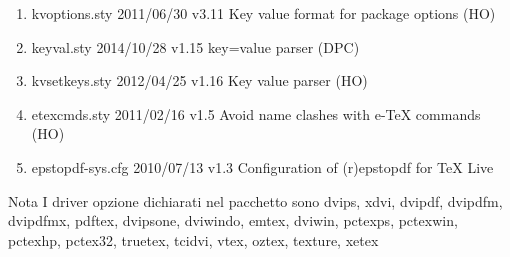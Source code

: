 \begin{enumerate}
\item kvoptions.sty 2011/06/30 v3.11 Key value format for package options (HO)
\item keyval.sty 2014/10/28 v1.15 key=value parser (DPC)
\item kvsetkeys.sty 2012/04/25 v1.16 Key value parser (HO)
\item etexcmds.sty 2011/02/16 v1.5 Avoid name clashes with e-TeX commands (HO)
\item epstopdf-sys.cfg 2010/07/13 v1.3 Configuration of (r)epstopdf for TeX Live	
\end{enumerate}	
Nota I driver opzione dichiarati nel pacchetto sono dvips, xdvi, dvipdf, dvipdfm, dvipdfmx, pdftex, dvipsone, dviwindo, emtex, dviwin, pctexps, pctexwin, pctexhp, pctex32, truetex, tcidvi, vtex, oztex, texture, xetex

